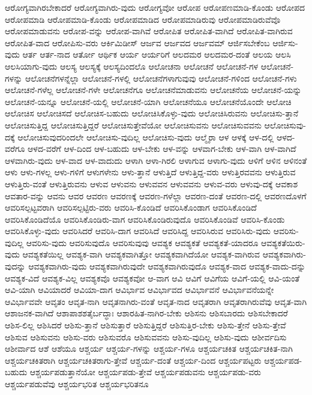{ಆರೋಗ್ಯವಾಗಿರಬೇಕಾದರೆ
ಆರೋಗ್ಯವಾಗಿರು-ವುದು
ಆರೋಗ್ಯವೋ
ಆರೋಪ
ಆರೋಪಣಮಾಡಿ-ಕೊಂಡು
ಆರೋಪದ
ಆರೋಪಮಾಡಿ
ಆರೋಪಮಾಡಿ-ಕೊಂಡು
ಆರೋಪಮಾಡಿದ
ಆರೋಪಮಾಡಿರುವು
ಆರೋಪಮಾಡಿರುವೆವೊ
ಆರೋಪಮಾಡುವನು
ಆರೋಪ-ವನ್ನು
ಆರೋಪ-ವಾಗಿವೆ
ಆರೋಪಿತ
ಆರೋಪಿತ-ವಾಗಿದೆ
ಆರೋಪಿತ-ವಾಗಿರುವ
ಆರೋಪಿತ-ವಾದ
ಆರೋಪಿಸು-ವರು
ಆರ್ಕಿಮಿಡೀಸ್
ಆರ್ಜವ
ಆರ್ಜವದ
ಆರ್ಜವಮ್
ಆರ್ಜಿಸಬೇಕೆಂಬ
ಆರ್ಜಿಸು-ವುದು
ಆರ್ತ
ಆರ್ತ-ನಾದ
ಆರ್ತೋ
ಆರ್ಥಿಕ
ಆರ್ಯ
ಆರ್ಯರಿಗೆ
ಆಲದಮರ
ಆಲದಮರ-ದಂತೆ
ಆಲಯ
ಆಲಸಿ
ಆಲಸಿಯಾಗು-ವುದು
ಆಲಸ್ಯ
ಆಲಸ್ಯಕ್ಕೆ
ಆಲಸ್ಯದಿಂದಲೊ
ಆಲೋಚನಾ
ಆಲೋಚನೆ
ಆಲೋಚನೆ-ಗಳ
ಆಲೋಚನೆ-ಗಳನ್ನು
ಆಲೋಚನೆಗಳನ್ನೆಲ್ಲಾ
ಆಲೋಚನೆ-ಗಳಲ್ಲಿ
ಆಲೋಚನೆಗಳಾಗುವುವು
ಆಲೋಚನೆ-ಗಳಿಂದ
ಆಲೋಚನೆ-ಗಳು
ಆಲೋಚನೆ-ಗಳೆಲ್ಲ
ಆಲೋಚನೆ-ಗಳೇ
ಆಲೋಚನೆಗೂ
ಆಲೋಚನೆಮಾಡುವನು
ಆಲೋಚನೆಯ
ಆಲೋಚನೆ-ಯನ್ನು
ಆಲೋಚನೆ-ಯನ್ನೂ
ಆಲೋಚನೆ-ಯಲ್ಲಿ
ಆಲೋಚನೆ-ಯಾಗಿ
ಆಲೋಚನೆಯೂ
ಆಲೋಚನೆಯೊಂದೇ
ಆಲೋಚಿ
ಆಲೋಚಿಸ
ಆಲೋಚಿಸದೆ
ಆಲೋಚಿಸ-ಬಹುದು
ಆಲೋಚಿಸಿಕೊಳ್ಳು-ವುದು
ಆಲೋಚಿಸಿರುವನು
ಆಲೋಚಿಸು-ತ್ತಾನೆ
ಆಲೋಚಿಸುತ್ತಿದ್ದ
ಆಲೋಚಿಸುತ್ತಿದ್ದರೆ
ಆಲೋಚಿಸುತ್ತೇವೆಯೋ
ಆಲೋಚಿಸುವನು
ಆಲೋಚಿಸುವವನು
ಆಲೋಚಿಸುವು-ದಕ್ಕೆ
ಆಲೋಚಿಸುವುದರಿಂದಲೇ
ಆಲೋಚಿಸು-ವುದಿಲ್ಲ
ಆಲೋಚಿಸು-ವುದು
ಆಲ್ಮೈರಾ
ಆಳ
ಆಳಕ್ಕೆ
ಆಳ-ದಲ್ಲಿ
ಆಳದ-ವರೆಗೂ
ಆಳದ-ವರೆಗೆ
ಆಳ-ದಿಂದ
ಆಳ-ಬಹುದು
ಆಳ-ಬೇಕು
ಆಳ-ವನ್ನು
ಆಳವಾಗ-ಬೇಕು
ಆಳ-ವಾಗಿ
ಆಳ-ವಾಗಿದೆ
ಆಳವಾಗಿರು-ವುದು
ಆಳ-ವಾದ
ಆಳ-ವಾದುದು
ಆಳಾಗಿ
ಆಳಾ-ಗಿರಲಿ
ಆಳಾಗುವ
ಆಳಾಗು-ವುದು
ಆಳಿಗೆ
ಆಳಿನ
ಆಳಿನಂತೆ
ಆಳು
ಆಳು-ಗಳಲ್ಲ
ಆಳು-ಗಳಿಗೆ
ಆಳುಗಳೇನು
ಆಳು-ತ್ತಾನೆ
ಆಳುತ್ತಿದೆ
ಆಳುತ್ತಿದ್ದ-ವರು
ಆಳುತ್ತಿರವವನು
ಆಳುತ್ತಿರುವ
ಆಳುತ್ತಿರು-ವಂತೆ
ಆಳುತ್ತಿರುವನು
ಆಳುವ
ಆಳುವನು
ಆಳುವವನ
ಆಳುವವನು
ಆಳುವ-ವರು
ಆಳುವು-ದಕ್ಕೆ
ಆವಕಾಶ
ಆವತಾರ-ವನ್ನು
ಆವನು
ಆವರ
ಆವರಣ
ಆವರಣಕ್ಕೆ
ಆವರಣ-ಗಳೆಲ್ಲಾ
ಆವರಣ-ದಂತೆ
ಆವರಣ-ದಲ್ಲಿ
ಆವರಣದೊಳಗೆ
ಆವರಿಸಲ್ಪಟ್ಟವರಾಗಿ
ಆವರಿಸಲ್ಪಟ್ಟಿರು-ವರು
ಆವರಿಸಿ-ಕೊಂಡಿದೆ
ಆವರಿಸಿಕೊಂಡಾಗ
ಆವರಿಸಿಕೊಂಡಿದೆ
ಆವರಿಸಿಕೊಂಡಿದೆಯೊ
ಆವರಿಸಿಕೊಂಡಿರು-ವಾಗ
ಆವರಿಸಿಕೊಂಡಿರುವುದೊ
ಆವರಿಸಿಕೊಂಡಿವೆ
ಆವರಿಸಿ-ಕೊಂಡು
ಆವರಿಸಿಕೊಳ್ಳು-ವುದು
ಆವರಿಸಿದರೆ
ಆವರಿಸಿ-ದಾಗ
ಆವರಿಸಿದೆ
ಆವರಿಸಿದ್ದ
ಆವರಿಸಿರುವ
ಆವರಿಸಿರು-ವುದು
ಆವರಿಸು-ವುದಿಲ್ಲ
ಆವರಿಸು-ವುದು
ಆವರಿಸುವುದೊ
ಆವರಿಸುವುವು
ಆವಶ್ಯಕ
ಆವಶ್ಯಕತೆ
ಆವಶ್ಯಕತೆ-ಯಾದರೂ
ಆವಶ್ಯಕತೆಯಿರು-ವುದು
ಆವಶ್ಯಕತೆಯಿಲ್ಲ
ಆವಶ್ಯಕ-ವಾಗಿ
ಆವಶ್ಯಕವಾಗಿತ್ತೋ
ಆವಶ್ಯಕವಾಗಿದೆಯೋ
ಆವಶ್ಯಕ-ವಾಗಿರುವ
ಆವಶ್ಯಕವಾಗಿರು-ವುದನ್ನು
ಆವಶ್ಯಕವಾಗಿರು-ವುದು
ಆವಶ್ಯಕವಾಗಿರುವುದೇ
ಆವಶ್ಯಕವಾಗಿರುವುದೊ
ಆವಶ್ಯಕ-ವಾದ
ಆವಶ್ಯಕ-ವಾದು-ದನ್ನು
ಆವಶ್ಯಕ-ವಿದೆ
ಆವಶ್ಯಕ-ವಿಲ್ಲ
ಆವಶ್ಯಕವೊ
ಆವಶ್ಯಕವೋ
ಆ-ವಾಗ
ಆವಿ
ಆವಿಗೆ
ಆವಿಗೆಯ
ಆವಿಗೆ-ಯಲ್ಲಿ
ಆವಿ-ಯಂತೆ
ಆವಿ-ಯಾಗಿ
ಆವಿಯಾದರೆ
ಆವಿಯಾ-ದಾಗ
ಆವಿರ್ಭಾವ
ಆವಿರ್ಭಾವದ
ಆವಿರ್ಭಾವನೆ
ಆವಿರ್ಭಾವನೆಯನ್ನೇ
ಆವಿರ್ಭಾವವೇ
ಆವೃತಂ
ಆವೃತ-ನಾಗಿ
ಆವೃತನಾಗಿರು-ವಂತೆ
ಆವೃತ-ನಾದ
ಆವೃತರಾಗಿ
ಆವೃತರಾಗಿರುವೆವು
ಆವೃತ-ವಾಗಿ
ಆಶಾಜನಕ-ವಾಗಿದೆ
ಆಶಾಪಾಶಶತೈರ್ಬದ್ಧಾಃ
ಆಶಾರಹಿತ-ನಾಗಿರ-ಬೇಕು
ಆಶಿಸನು
ಆಶಿಸಬಾರದು
ಆಶಿಸಬೇಕಾದರೆ
ಆಶಿಸ-ಲಿಲ್ಲ
ಆಶಿಸಿದರೆ
ಆಶಿಸು-ತ್ತಾನೆ
ಆಶಿಸುತ್ತಾರೆ
ಆಶಿಸುತ್ತಿದ್ದರೆ
ಆಶಿಸುತ್ತಿರ-ಬೇಕು
ಆಶಿಸು-ತ್ತೇನೆ
ಆಶಿಸು-ತ್ತೇವೆ
ಆಶಿಸುವ
ಆಶಿಸುವನು
ಆಶಿಸು-ವರು
ಆಶಿಸುವರೊ
ಆಶಿಸುವವನು
ಆಶಿಸು-ವುದಿಲ್ಲ
ಆಶಿಸು-ವುದು
ಆಶೀರ್ವದಿಸು
ಆಶೀರ್ವಾದ
ಆಶೆ
ಆಶೆಯೂ
ಆಶ್ಚರ್ಯ
ಆಶ್ಚರ್ಯ-ಗಳನ್ನು
ಆಶ್ಚರ್ಯ-ಗಳೂ
ಆಶ್ಚರ್ಯಚಕಿತ
ಆಶ್ಚರ್ಯಚಕಿತ-ನಾಗಿ
ಆಶ್ಚರ್ಯಚಕಿತರಾಗಿ
ಆಶ್ಚರ್ಯಚಕಿತರಾಗು-ತ್ತೇವೆ
ಆಶ್ಚರ್ಯ-ದಂತೆ
ಆಶ್ಚರ್ಯ-ದಿಂದ
ಆಶ್ಚರ್ಯಪಟ್ಟರು
ಆಶ್ಚರ್ಯಪಡ-ಬಹುದು
ಆಶ್ಚರ್ಯಪಡುತ್ತಾನೆಯೋ
ಆಶ್ಚರ್ಯಪಡು-ತ್ತೇವೆ
ಆಶ್ಚರ್ಯಪಡುವನು
ಆಶ್ಚರ್ಯಪಡು-ವರು
ಆಶ್ಚರ್ಯಪಡುವೆವು
ಆಶ್ಚರ್ಯಭರಿತ
ಆಶ್ಚರ್ಯಭರಿತನೂ
}
